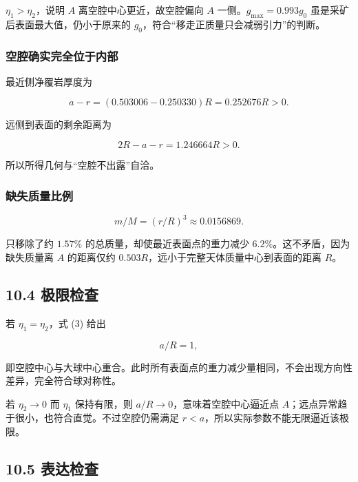 \documentclass[
  11pt,
  UTF8]{ctexart}
\begin{document}
\(η_1>η_2\)，说明 \(A\) 离空腔中心更近，故空腔偏向 \(A\)
一侧。\(g_{\max}=0.993g_0\) 虽是采矿后表面最大值，仍小于原来的
\(g_0\)，符合``移走正质量只会减弱引力''的判断。

\hypertarget{ux7a7aux8154ux786eux5b9eux5b8cux5168ux4f4dux4e8eux5185ux90e8}{%
\subsubsection{空腔确实完全位于内部}\label{ux7a7aux8154ux786eux5b9eux5b8cux5168ux4f4dux4e8eux5185ux90e8}}

最近侧净覆岩厚度为

\[a-r=(0.503006-0.250330)R=0.252676R>0.\]

远侧到表面的剩余距离为

\[2R-a-r=1.246664R>0.\]

所以所得几何与``空腔不出露''自洽。

\hypertarget{ux7f3aux5931ux8d28ux91cfux6bd4ux4f8b}{%
\subsubsection{缺失质量比例}\label{ux7f3aux5931ux8d28ux91cfux6bd4ux4f8b}}

\[m/M=(r/R)^3≈0.0156869.\]

只移除了约 \(1.57\%\) 的总质量，却使最近表面点的重力减少
\(6.2\%\)。这不矛盾，因为缺失质量离 \(A\) 的距离仅约
\(0.503R\)，远小于完整天体质量中心到表面的距离 \(R\)。

\hypertarget{ux6781ux9650ux68c0ux67e5}{%
\subsection{10.4 极限检查}\label{ux6781ux9650ux68c0ux67e5}}

若 \(η_1=η_2\)，式 (3) 给出

\[a/R=1,\]

即空腔中心与大球中心重合。此时所有表面点的重力减少量相同，不会出现方向性差异，完全符合球对称性。

若 \(η_2\to0\) 而 \(η_1\) 保持有限，则 \(a/R\to0\)，意味着空腔中心逼近点
\(A\)；远点异常趋于很小，也符合直觉。不过空腔仍需满足
\(r<a\)，所以实际参数不能无限逼近该极限。

\hypertarget{ux8868ux8fbeux68c0ux67e5}{%
\subsection{10.5 表达检查}\label{ux8868ux8fbeux68c0ux67e5}}
\end{document}
